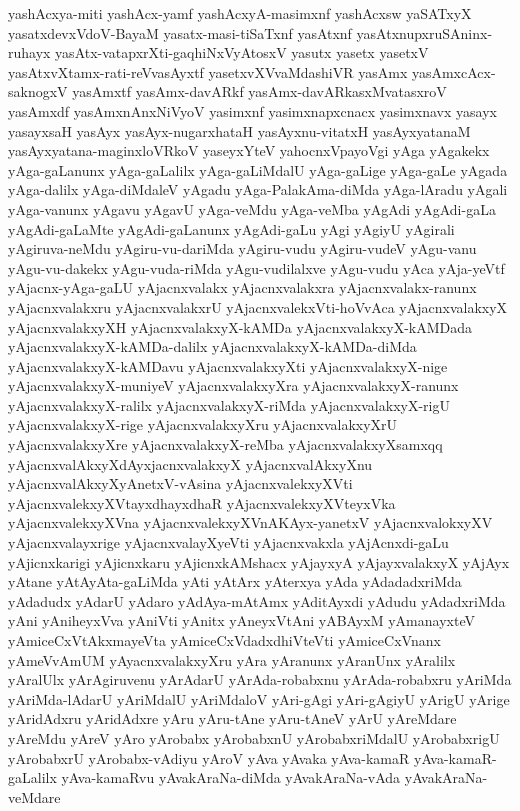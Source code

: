 {yashAcxya-miti
yashAcx-yamf
yashAcxyA-masimxnf
yashAcxsw
yaSATxyX
yasatxdevxVdoV-BayaM
yasatx-masi-tiSaTxnf
yasAtxnf
yasAtxnupxruSAninx-ruhayx
yasAtx-vatapxrXti-gaqhiNxVyAtosxV
yasutx
yasetx
yasetxV
yasAtxvXtamx-rati-reVvasAyxtf
yasetxvXVvaMdashiVR
yasAmx
yasAmxcAcx-saknogxV
yasAmxtf
yasAmx-davARkf
yasAmx-davARkasxMvatasxroV
yasAmxdf
yasAmxnAnxNiVyoV
yasimxnf
yasimxnapxcnacx
yasimxnavx
yasayx
yasayxsaH
yasAyx
yasAyx-nugarxhataH
yasAyxnu-vitatxH
yasAyxyatanaM
yasAyxyatana-maginxloVRkoV
yaseyxYteV
yahocnxVpayoVgi
yAga
yAgakekx
yAga-gaLanunx
yAga-gaLalilx
yAga-gaLiMdalU
yAga-gaLige
yAga-gaLe
yAgada
yAga-dalilx
yAga-diMdaleV
yAgadu
yAga-PalakAma-diMda
yAga-lAradu
yAgali
yAga-vanunx
yAgavu
yAgavU
yAga-veMdu
yAga-veMba
yAgAdi
yAgAdi-gaLa
yAgAdi-gaLaMte
yAgAdi-gaLanunx
yAgAdi-gaLu
yAgi
yAgiyU
yAgirali
yAgiruva-neMdu
yAgiru-vu-dariMda
yAgiru-vudu
yAgiru-vudeV
yAgu-vanu
yAgu-vu-dakekx
yAgu-vuda-riMda
yAgu-vudilalxve
yAgu-vudu
yAca
yAja-yeVtf
yAjacnx-yAga-gaLU
yAjacnxvalakx
yAjacnxvalakxra
yAjacnxvalakx-ranunx
yAjacnxvalakxru
yAjacnxvalakxrU
yAjacnxvalekxVti-hoVvAca
yAjacnxvalakxyX
yAjacnxvalakxyXH
yAjacnxvalakxyX-kAMDa
yAjacnxvalakxyX-kAMDada
yAjacnxvalakxyX-kAMDa-dalilx
yAjacnxvalakxyX-kAMDa-diMda
yAjacnxvalakxyX-kAMDavu
yAjacnxvalakxyXti
yAjacnxvalakxyX-nige
yAjacnxvalakxyX-muniyeV
yAjacnxvalakxyXra
yAjacnxvalakxyX-ranunx
yAjacnxvalakxyX-ralilx
yAjacnxvalakxyX-riMda
yAjacnxvalakxyX-rigU
yAjacnxvalakxyX-rige
yAjacnxvalakxyXru
yAjacnxvalakxyXrU
yAjacnxvalakxyXre
yAjacnxvalakxyX-reMba
yAjacnxvalakxyXsamxqq
yAjacnxvalAkxyXdAyxjacnxvalakxyX
yAjacnxvalAkxyXnu
yAjacnxvalAkxyXyAnetxV-vAsina
yAjacnxvalekxyXVti
yAjacnxvalekxyXVtayxdhayxdhaR
yAjacnxvalekxyXVteyxVka
yAjacnxvalekxyXVna
yAjacnxvalekxyXVnAKAyx-yanetxV
yAjacnxvalokxyXV
yAjacnxvalayxrige
yAjacnxvalayXyeVti
yAjacnxvakxla
yAjAcnxdi-gaLu
yAjicnxkarigi
yAjicnxkaru
yAjicnxkAMshacx
yAjayxyA
yAjayxvalakxyX
yAjAyx
yAtane
yAtAyAta-gaLiMda
yAti
yAtArx
yAterxya
yAda
yAdadadxriMda
yAdadudx
yAdarU
yAdaro
yAdAya-mAtAmx
yAditAyxdi
yAdudu
yAdadxriMda
yAni
yAniheyxVva
yAniVti
yAnitx
yAneyxVtAni
yABAyxM
yAmanayxteV
yAmiceCxVtAkxmayeVta
yAmiceCxVdadxdhiVteVti
yAmiceCxVnanx
yAmeVvAmUM
yAyacnxvalakxyXru
yAra
yAranunx
yAranUnx
yAralilx
yAralUlx
yArAgiruvenu
yArAdarU
yArAda-robabxnu
yArAda-robabxru
yAriMda
yAriMda-lAdarU
yAriMdalU
yAriMdaloV
yAri-gAgi
yAri-gAgiyU
yArigU
yArige
yAridAdxru
yAridAdxre
yAru
yAru-tAne
yAru-tAneV
yArU
yAreMdare
yAreMdu
yAreV
yAro
yArobabx
yArobabxnU
yArobabxriMdalU
yArobabxrigU
yArobabxrU
yArobabx-vAdiyu
yAroV
yAva
yAvaka
yAva-kamaR
yAva-kamaR-gaLalilx
yAva-kamaRvu
yAvakAraNa-diMda
yAvakAraNa-vAda
yAvakAraNa-veMdare
}
